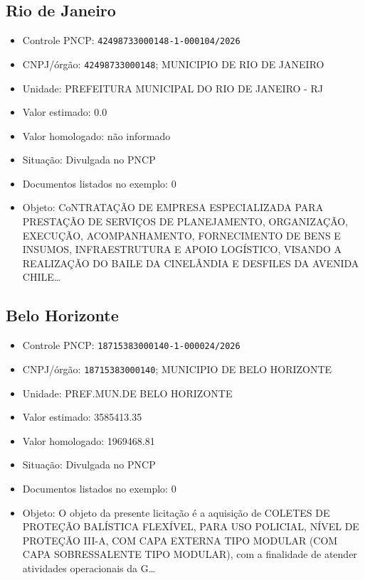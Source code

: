 \documentclass[12pt]{article}
\providecommand{\tightlist}{%
  \setlength{\itemsep}{0pt}\setlength{\parskip}{0pt}}
\begin{document}
\subsection{Rio de Janeiro}\label{rio-de-janeiro}

\begin{itemize}
\tightlist
\item
  Controle PNCP: \texttt{42498733000148-1-000104/2026}
\item
  CNPJ/órgão: \texttt{42498733000148}; MUNICIPIO DE RIO DE JANEIRO
\item
  Unidade: PREFEITURA MUNICIPAL DO RIO DE JANEIRO - RJ
\item
  Valor estimado: 0.0
\item
  Valor homologado: não informado
\item
  Situação: Divulgada no PNCP
\item
  Documentos listados no exemplo: 0
\item
  Objeto: CoNTRATAÇÃO DE EMPRESA ESPECIALIZADA PARA PRESTAÇÃO DE
  SERVIÇOS DE PLANEJAMENTO, ORGANIZAÇÃO, EXECUÇÃO, ACOMPANHAMENTO,
  FORNECIMENTO DE BENS E INSUMOS, INFRAESTRUTURA E APOIO LOGÍSTICO,
  VISANDO A REALIZAÇÃO DO BAILE DA CINELÂNDIA E DESFILES DA AVENIDA
  CHILE\ldots{}
\end{itemize}

\subsection{Belo Horizonte}\label{belo-horizonte}

\begin{itemize}
\tightlist
\item
  Controle PNCP: \texttt{18715383000140-1-000024/2026}
\item
  CNPJ/órgão: \texttt{18715383000140}; MUNICIPIO DE BELO HORIZONTE
\item
  Unidade: PREF.MUN.DE BELO HORIZONTE
\item
  Valor estimado: 3585413.35
\item
  Valor homologado: 1969468.81
\item
  Situação: Divulgada no PNCP
\item
  Documentos listados no exemplo: 0
\item
  Objeto: O objeto da presente licitação é a aquisição de COLETES DE
  PROTEÇÃO BALÍSTICA FLEXÍVEL, PARA USO POLICIAL, NÍVEL DE PROTEÇÃO
  III-A, COM CAPA EXTERNA TIPO MODULAR (COM CAPA SOBRESSALENTE TIPO
  MODULAR), com a finalidade de atender atividades operacionais da
  G\ldots{}
\end{itemize}
\end{document}
